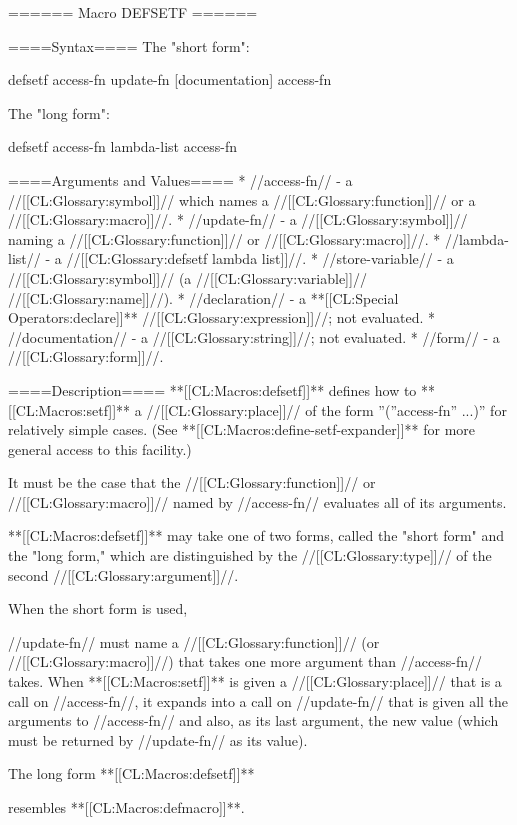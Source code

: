 ====== Macro DEFSETF ======

====Syntax====
The "short form":

\DefmacWithValuesNewline defsetf {access-fn update-fn [documentation]} {access-fn}

The "long form":

\DefmacWithValuesNewline defsetf {access-fn lambda-list  {\DeclsAndDoc} } {access-fn}

====Arguments and Values====
  * //access-fn// - a //[[CL:Glossary:symbol]]// which names a //[[CL:Glossary:function]]// or a //[[CL:Glossary:macro]]//.
  * //update-fn// - a //[[CL:Glossary:symbol]]// naming a //[[CL:Glossary:function]]// or //[[CL:Glossary:macro]]//.
  * //lambda-list// - a //[[CL:Glossary:defsetf lambda list]]//.
  * //store-variable// - a //[[CL:Glossary:symbol]]// (a //[[CL:Glossary:variable]]// //[[CL:Glossary:name]]//).
  * //declaration// - a **[[CL:Special Operators:declare]]** //[[CL:Glossary:expression]]//; not evaluated.
  * //documentation// - a //[[CL:Glossary:string]]//; not evaluated.
  * //form// - a //[[CL:Glossary:form]]//.

====Description====
**[[CL:Macros:defsetf]]** defines how to **[[CL:Macros:setf]]** a //[[CL:Glossary:place]]// of the form ''(''access-fn'' ...)'' for relatively simple cases. (See **[[CL:Macros:define-setf-expander]]** for more general access to this facility.)

It must be the case that the //[[CL:Glossary:function]]// or //[[CL:Glossary:macro]]// named by //access-fn// evaluates all of its arguments.

**[[CL:Macros:defsetf]]** may take one of two forms, called the "short form" and the "long form," which are distinguished by the //[[CL:Glossary:type]]// of the second //[[CL:Glossary:argument]]//.

When the short form is used,

//update-fn// must name a //[[CL:Glossary:function]]// (or //[[CL:Glossary:macro]]//) that takes one more argument than //access-fn// takes. When **[[CL:Macros:setf]]** is given a //[[CL:Glossary:place]]// that is a call on //access-fn//, it expands into a call on //update-fn// that is given all the arguments to //access-fn// and also, as its last argument, the new value (which must be returned by //update-fn// as its value).

The long form **[[CL:Macros:defsetf]]**

resembles **[[CL:Macros:defmacro]]**.

